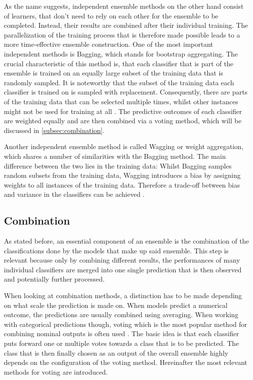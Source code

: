 As the name suggests, independent ensemble methods on the other hand consist of learners, that don’t need to rely on each other for the ensemble to be completed. Instead, their results are combined after their individual training. The parallelization of the training process that is therefore made possible leads to a more time-effective ensemble construction. One of the most important independent methods is Bagging, which stands for bootstrap aggregating. The crucial characteristic of this method is, that each classifier that is part of the ensemble is trained on an equally large subset of the training data that is randomly sampled. It is noteworthy that the subset of the training data each classifier is trained on is sampled with replacement. Consequently, there are parts of the training data that can be selected multiple times, whilst other instances might not be used for training at all \cite{martinez-munoz2004}. The predictive outcomes of each classifier are weighted equally and are then combined via a voting method, which will be discussed in \autoref{subsec:combination}.

Another independent ensemble method is called Wagging or weight aggregation, which shares a number of similarities with the Bagging method. The main difference between the two lies in the training data: Whilst Bagging samples random subsets from the training data, Wagging introduces a bias by assigning weights to all instances of the training data. Therefore a trade-off between bias and variance in the classifiers can be achieved \cite{bauer1999}.



\subsection{Combination}\label{subsec:combination}

As stated before, an essential component of an ensemble is the combination of the classifications done by the models that make up said ensemble. This step is relevant because only by combining different results, the performances of many individual classifiers are merged into one single prediction that is then observed and potentially further processed. 

When looking at combination methods, a distinction has to be made depending on what scale the prediction is made on. When models predict a numerical outcome, the predictions are usually combined using averaging. When working with categorical predictions though, voting which is the most popular method for combining nominal outputs is often used \cite{zhou2012}. The basic idea is that each classifier puts forward one or multiple votes towards a class that is to be predicted. The class that is then finally chosen as an output of the overall ensemble highly depends on the configuration of the voting method. Hereinafter the most relevant methods for voting are introduced. 

